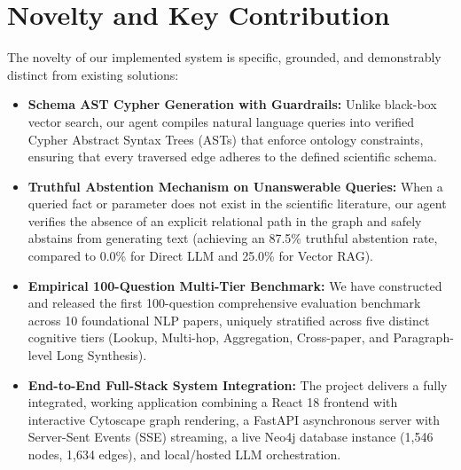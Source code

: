 \section{Novelty and Key Contribution}
The novelty of our implemented system is specific, grounded, and demonstrably distinct from existing solutions:
\begin{itemize}
    \item \textbf{Schema AST Cypher Generation with Guardrails:} Unlike black-box vector search, our agent compiles natural language queries into verified Cypher Abstract Syntax Trees (ASTs) that enforce ontology constraints, ensuring that every traversed edge adheres to the defined scientific schema.
    \item \textbf{Truthful Abstention Mechanism on Unanswerable Queries:} When a queried fact or parameter does not exist in the scientific literature, our agent verifies the absence of an explicit relational path in the graph and safely abstains from generating text (achieving an 87.5\% truthful abstention rate, compared to 0.0\% for Direct LLM and 25.0\% for Vector RAG).
    \item \textbf{Empirical 100-Question Multi-Tier Benchmark:} We have constructed and released the first 100-question comprehensive evaluation benchmark across 10 foundational NLP papers, uniquely stratified across five distinct cognitive tiers (Lookup, Multi-hop, Aggregation, Cross-paper, and Paragraph-level Long Synthesis).
    \item \textbf{End-to-End Full-Stack System Integration:} The project delivers a fully integrated, working application combining a React 18 frontend with interactive Cytoscape graph rendering, a FastAPI asynchronous server with Server-Sent Events (SSE) streaming, a live Neo4j database instance (1,546 nodes, 1,634 edges), and local/hosted LLM orchestration.
\end{itemize}
